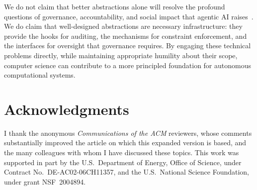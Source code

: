 \documentclass[11pt]{article}
\begin{document}
We do not claim that better abstractions alone will resolve the profound questions of governance, accountability, and social impact that agentic AI raises~\cite{singapore_consensus}. We do claim that well-designed abstractions are necessary infrastructure: they provide the hooks for auditing, the mechanisms for constraint enforcement, and the interfaces for oversight that governance requires. By engaging these technical problems directly, while maintaining appropriate humility about their scope, computer science can contribute to a more principled foundation for autonomous computational systems.

\section*{Acknowledgments}

I thank the anonymous \textit{Communications of the ACM} reviewers, whose comments substantially improved the article on which this expanded version is based, and the many colleagues with whom I have discussed these topics.
This work was supported in part by the U.S.\ Department of Energy, Office of Science, under Contract No.\ DE-AC02-06CH11357, and the U.S.\ National Science Foundation, under grant NSF~2004894.

\printbibliography
\end{document}

